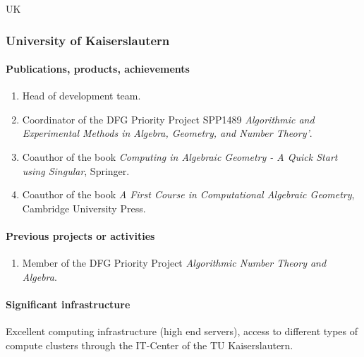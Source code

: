 \begin{sitedescription}{UK}
\subsubsection{University of Kaiserslautern}




\paragraph{Publications, products, achievements}

\begin{enumerate}
\item Head of {} development team.
\item Coordinator of the DFG Priority Project SPP1489 \emph{Algorithmic and Experimental Methods in Algebra, Geometry, and
Number Theory'}.
\item Coauthor of the book \emph{Computing in Algebraic Geometry - A Quick Start using Singular}, Springer.
\item Coauthor of the book \emph{A First Course in Computational Algebraic Geometry}, 
Cambridge University Press.
\end{enumerate}

\paragraph{Previous projects or activities}

\begin{enumerate}
\item Member of the DFG Priority Project \emph{Algorithmic Number Theory and Algebra}.
\end{enumerate}

\paragraph{Significant infrastructure}

Excellent computing infrastructure (high end servers), access to 
different types of compute clusters through the IT-Center of the 
TU Kaiserslautern.
\end{sitedescription}


